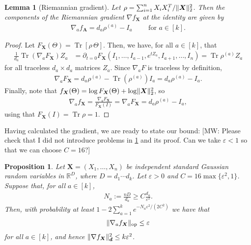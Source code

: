 \documentclass{article}
\newtheorem{prop}[theorem]{Proposition}
\newtheorem{lemma}[theorem]{Lemma}
\DeclarePairedDelimiter{\norm}{\lVert}{\rVert}
\newcommand{\R}{{\mathbb{R}}}
\newcommand{\ot}{\otimes}
\newcommand{\op}{\operatorname{op}}
\renewcommand{\vec}{\bm}
\newcommand\eps{\varepsilon}
\newcommand\tr{\operatorname{Tr}}
\newcommand{\MW}[1]{{\color{red}[MW: #1]}}
\begin{document}
\begin{lemma}[Riemannian gradient]
Let $\rho = \sum_{i=1}^n X_i X_i^T / \norm{\vec X}_2^2$.
Then the components of the Riemannian gradient $\nabla f_{\vec X}$ at the identity are given by
\begin{align*}
  \nabla_a f_{\vec A} = d_a \rho^{(a)} - I_a \qquad \text{ for } a \in [k].
\end{align*}
\end{lemma}
\begin{proof}
  Let $F_{\vec X}(\Theta) = \tr[\rho \, \Theta]$.
  Then, we have, for all $a\in[k]$, that
  \begin{align*}
    \frac1{d_a} \tr (\nabla_a F_{\vec X}) Z_a
  &= \partial_{t=0} F_{\vec X}(I_1,\dots,I_{a-1}, e^{tZ_a}, I_{a+1},\dots,I_n)
  = \tr \rho^{(a)} Z_a
  \end{align*}
  for all traceless $d_a \times d_a$ matrices $Z_a$.
  Since $\nabla_a F$ is traceless by definition,
  \begin{align*}
    \nabla_a F_{\vec X}
  = d_a \rho^{(a)} - \tr(\rho^{(a)}) I_a
  = d_a \rho^{(a)} - I_a.
  \end{align*}
  Finally, note that $f_{\vec X}(\Theta) = \log F_{\vec X}(\Theta) + \log \norm{\vec X}_2^2$, so
  \begin{align*}
    \nabla_a f_{\vec X}
  = \frac{\nabla_a F_{\vec X}}{F_{\vec X}(I)}
  = \nabla_a F_{\vec X}
  = d_a \rho^{(a)} - I_a,
  \end{align*}
  using that $F_{\vec X}(I) = \tr \rho = 1$.
\end{proof}

Having calculated the gradient, we are ready to state our bound:
\MW{Please check that I did not introduce problems in \cref{prop:gradient-bound} and its proof. Can we take $\eps<1$ so that we can choose $C=16$?}

\begin{prop}\label{prop:gradient-bound}
Let $\vec X = (X_1,\dots,X_n)$ be independent standard Gaussian random variables in $\R^D$, where $D=d_1\cdots{}d_k$.
Let $\eps>0$ and $C = 16\max\{\eps^2,1\}$.
Suppose that, for all $a \in [k]$,
\begin{align*}
  N_a := \frac{n D}{d_a} \geq C \frac{d_a}{\eps^2}.
\end{align*}
Then, with probability at least $1 - 2 \sum_{a=1}^k e^{-N_a \eps^2/(2C^2)}$ we have that
\begin{align*}
  \norm{\nabla_a f_{\vec X}}_{\op} \leq \eps
\end{align*}
for all $a\in[k]$, and hence $\norm{\nabla f_{\vec X}}_{\vec d}^2 \leq k \eps^2$.
\end{prop}
\end{document}
